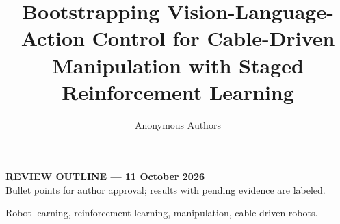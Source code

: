 \documentclass[letterpaper,journal]{IEEEtran}
\begin{document}
\title{Bootstrapping Vision-Language-Action Control for Cable-Driven Manipulation with Staged Reinforcement Learning}
\author{Anonymous Authors}
\maketitle
\begin{center}\small\textbf{REVIEW OUTLINE --- 11 October 2026}\\
Bullet points for author approval; results with pending evidence are labeled.
\end{center}

\begin{IEEEkeywords}
Robot learning, reinforcement learning, manipulation, cable-driven robots.
\end{IEEEkeywords}











\end{document}
